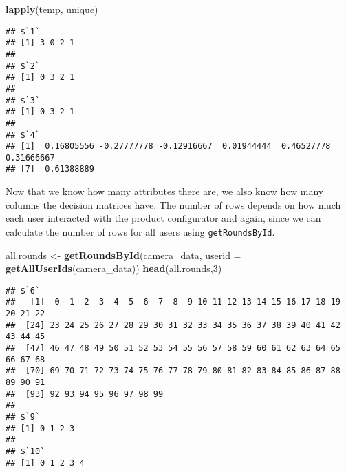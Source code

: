 \documentclass[]{article}
\newenvironment{Shaded}{\begin{snugshade}}{\end{snugshade}}
\newcommand{\KeywordTok}[1]{\textcolor[rgb]{0.13,0.29,0.53}{\textbf{{#1}}}}
\newcommand{\DataTypeTok}[1]{\textcolor[rgb]{0.13,0.29,0.53}{{#1}}}
\newcommand{\DecValTok}[1]{\textcolor[rgb]{0.00,0.00,0.81}{{#1}}}
\newcommand{\StringTok}[1]{\textcolor[rgb]{0.31,0.60,0.02}{{#1}}}
\newcommand{\NormalTok}[1]{{#1}}
\begin{document}
\begin{Shaded}
\begin{Highlighting}[]
\KeywordTok{lapply}\NormalTok{(temp, unique)}
\end{Highlighting}
\end{Shaded}

\begin{verbatim}
## $`1`
## [1] 3 0 2 1
## 
## $`2`
## [1] 0 3 2 1
## 
## $`3`
## [1] 0 3 2 1
## 
## $`4`
## [1]  0.16805556 -0.27777778 -0.12916667  0.01944444  0.46527778  0.31666667
## [7]  0.61388889
\end{verbatim}

Now that we know how many attributes there are, we also know how many
columns the decision matrices have. The number of rows depends on how
much each user interacted with the product configurator and again, since
we can calculate the number of rows for all users using
\texttt{getRoundsById}.

\begin{Shaded}
\begin{Highlighting}[]
\NormalTok{all.rounds <-}\StringTok{ }\KeywordTok{getRoundsById}\NormalTok{(camera_data, }\DataTypeTok{userid =} \KeywordTok{getAllUserIds}\NormalTok{(camera_data))}
\KeywordTok{head}\NormalTok{(all.rounds,}\DecValTok{3}\NormalTok{)}
\end{Highlighting}
\end{Shaded}

\begin{verbatim}
## $`6`
##   [1]  0  1  2  3  4  5  6  7  8  9 10 11 12 13 14 15 16 17 18 19 20 21 22
##  [24] 23 24 25 26 27 28 29 30 31 32 33 34 35 36 37 38 39 40 41 42 43 44 45
##  [47] 46 47 48 49 50 51 52 53 54 55 56 57 58 59 60 61 62 63 64 65 66 67 68
##  [70] 69 70 71 72 73 74 75 76 77 78 79 80 81 82 83 84 85 86 87 88 89 90 91
##  [93] 92 93 94 95 96 97 98 99
## 
## $`9`
## [1] 0 1 2 3
## 
## $`10`
## [1] 0 1 2 3 4
\end{verbatim}
\end{document}
